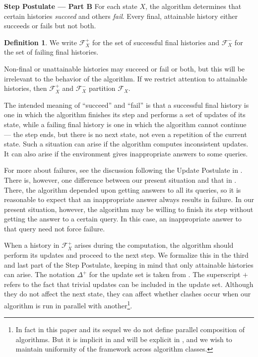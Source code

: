 \documentclass{LMCS}
\theoremstyle{definition}
\newtheorem{df}[thm]{Definition}
\newenvironment{unn}[1]{\bigskip\noindent\textbf{#1}\quad}{\par\bigskip}
\newcommand{\DD}{\Delta^+}
\newcommand{\scr}[1]{\ensuremath{\mathcal {#1}}}
\begin{document}
\begin{unn}{Step Postulate --- Part B}
  For each state $X$, the algorithm determines that certain histories
  \emph{succeed} and others \emph{fail}.  Every final, attainable
  history either succeeds or fails but not both.  
\end{unn}

\begin{df}
  We write $\scr F_X^+$ for the set of successful final histories and
  $\scr F_X^-$ for the set of failing final histories.
\end{df}

Non-final or unattainable histories may succeed or fail or both, but
this will be irrelevant to the behavior of the algorithm.  If we
restrict attention to attainable histories, then $\scr F_X^+$ and $\scr
F_X^-$ partition $\scr F_X$.

The intended meaning of ``succeed'' and ``fail'' is that a successful
final history is one in which the algorithm finishes its step and
performs a set of updates of its state, while a failing final history
is one in which the algorithm cannot continue --- the step ends, but
there is no next state, not even a repetition of the current state.
Such a situation can arise if the algorithm computes inconsistent
updates.  It can also arise if the environment gives inappropriate
answers to some queries.

For more about failures, see the discussion following the Update
Postulate in \cite[Section~5]{oa1}.  There is, however, one difference
between our present situation and that in \cite{oa1}.  There, the
algorithm depended upon getting answers to all its queries, so it is
reasonable to expect that an inappropriate answer always results in
failure.  In our present situation, however, the algorithm may be
willing to finish its step without getting the answer to a certain
query.  In this case, an inappropriate answer to that query need not
force failure.

When a history in $\scr F^+_X$ arises during the computation, the
algorithm should perform its updates and proceed to the next step.
We formalize this in the third and last part of the Step Postulate,
keeping in mind that only attainable histories can arise.  The
notation $\DD$ for the update set is taken from \cite{oa1}.  The
superscript $+$ refers to the fact that trivial updates can be
included in the update set.  Although they do not affect the next
state, they can affect whether clashes occur when our algorithm is
run in parallel with another\footnote{In fact in this paper and
    its sequel \cite{ga2} we
do not define parallel composition of algorithms. But it is implicit
in \cite{oa3} and will be explicit in \cite{composite}, and we wish
to maintain uniformity of the framework across algorithm classes.}.
\end{document}
